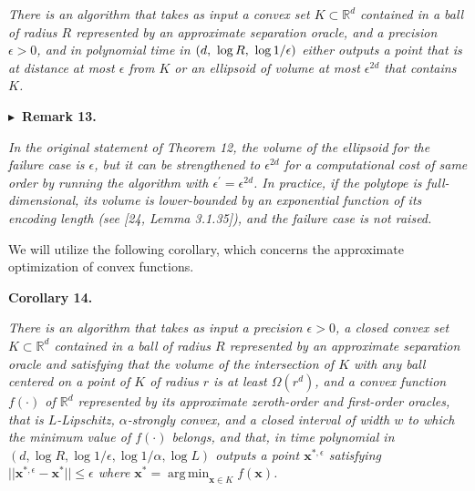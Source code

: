 \emph{There is an algorithm that takes as input a convex set $K\subset\mathbb{R}^{d}$ contained in a ball of radius $R$ represented by an approximate separation oracle, and a precision $\epsilon>0$, and in polynomial time in $\left(d,\nobreak\ \log R,\nobreak\ \log 1/\epsilon\right)$ either outputs a point that is at distance at most $\epsilon$ from $K$ or an ellipsoid of volume at most $\epsilon^{2d}$ that contains $K$.}\par







\par\medskip\noindent\textbf{
$\blacktriangleright$ Remark 13.
}\par



\emph{In the original statement of Theorem 12, the volume of the ellipsoid for the failure case is $\epsilon$, but it can be strengthened to $\epsilon^{2d}$ for a computational cost of same order by running the algorithm with $\epsilon^{\prime}=\epsilon^{2d}$. In practice, if the polytope is full-dimensional, its volume is lower-bounded by an exponential function of its encoding length (see [24, Lemma 3.1.35]), and the failure case is not raised.}\par






We will utilize the following corollary, which concerns the approximate optimization of convex functions.\par





\par\medskip\noindent\textbf{
\textbf{Corollary 14}\textbf{.}
}\par



\emph{There is an algorithm that takes as input a precision $\epsilon>0$, a closed convex set $K\subset\mathbb{R}^{d}$ contained in a ball of radius $R$ represented by an approximate separation oracle and satisfying that the volume of the intersection of $K$ with any ball centered on a point of $K$ of radius $r$ is at least $\Omega(r^{d})$, and a convex function $f(\cdot)$ of $\mathbb{R}^{d}$ represented by its approximate zeroth-order and first-order oracles, that is $L$-Lipschitz, $\alpha$-strongly convex, and a closed interval of width $w$ to which the minimum value of $f(\cdot)$ belongs, and that, in time polynomial in $(d,\log R,\log 1/\epsilon,\log 1/\alpha,\log L)$ outputs a point ${\boldsymbol{x}}^{*,\epsilon}$ satisfying $||{\boldsymbol{x}}^{*,\epsilon}-{\boldsymbol{x}}^{*}||\leq\epsilon$ where ${\boldsymbol{x}}^{*}=\operatorname*{arg\,min}_{{\boldsymbol{x}}\in K}f({\boldsymbol{x}})$.}\par



